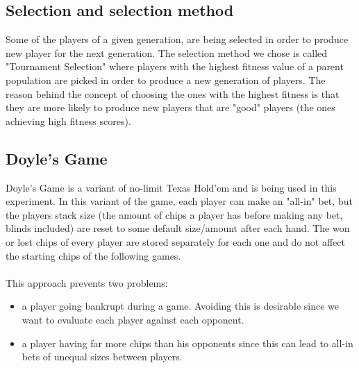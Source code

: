 \documentclass[12pt,fleqn,a4paper]{article}
\begin{document}
\subsection{Selection and selection method}
\label{selection}
Some of the players of a given generation, are being selected in order to produce new player for the next generation. The selection method we chose is called "Tournament Selection" where players with the highest fitness value of a parent population are picked in order to produce a new generation of players. The reason behind the concept of choosing the ones with the highest fitness is that they are more likely to produce new players that are "good" players (the ones achieving high fitness scores). 

\subsection{Doyle's Game}
\label{doyle}
Doyle's Game is a variant of no-limit Texas Hold'em and is being used in this experiment. In this variant of the game, each player can make an "all-in" bet, but the players stack size (the amount of chips a player has before making any bet, blinds included) are reset to some default size/amount after each hand. The won or lost chips of every player are stored separately for each one and do not affect the starting chips of the following games.\\\\
This approach prevents two problems:
\begin{itemize}
	\item a player going bankrupt during a game. Avoiding this is desirable since we want to evaluate each player against each opponent.
	\item a player having far more chips than his opponents since this can lead to all-in bets of unequal sizes between players.
\end{itemize}
\end{document}
